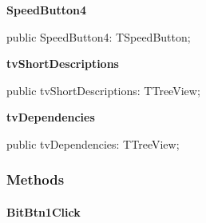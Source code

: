 \documentclass{report}
\newif\ifpdf
\begin{document}
\begin{list}{}
\begin{flushleft}
\ifpdf
\end{flushleft}
\fi


\par  \label{prjwizard.TfrmProjectWizard-SpeedButton4}
\item[\textbf{SpeedButton4}\hfill]
\ifpdf
\begin{flushleft}
\fi
\begin{ttfamily}
public SpeedButton4: TSpeedButton;\end{ttfamily}

\ifpdf
\end{flushleft}
\fi


\par  \label{prjwizard.TfrmProjectWizard-tvShortDescriptions}
\item[\textbf{tvShortDescriptions}\hfill]
\ifpdf
\begin{flushleft}
\fi
\begin{ttfamily}
public tvShortDescriptions: TTreeView;\end{ttfamily}

\ifpdf
\end{flushleft}
\fi


\par  \label{prjwizard.TfrmProjectWizard-tvDependencies}
\item[\textbf{tvDependencies}\hfill]
\ifpdf
\begin{flushleft}
\fi
\begin{ttfamily}
public tvDependencies: TTreeView;\end{ttfamily}

\ifpdf
\end{flushleft}
\fi


\par  \end{list}
\subsubsection*{\large{\textbf{Methods}}\normalsize\hspace{1ex}\hfill}
\paragraph*{BitBtn1Click}\hspace*{\fill}
\end{document}
